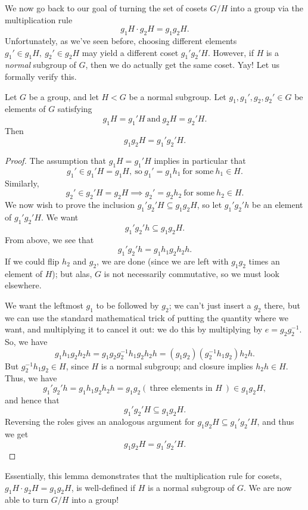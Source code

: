 \documentclass[math1530-lecture-notes]{subfiles}
\begin{document}
We now go back to our goal of turning the set of cosets $G / H$ into a group via the multiplication
rule \[
  g_1H\cdot g_2H=g_1g_2H
.\] Unfortunately, as we've seen before, choosing different elements $g_1'\in g_1H,\ g_2'\in g_2H$
may yield a different coset $g_1'g_2'H$. However, if $H$ is a \textit{normal} subgroup of $G$, then
we do actually get the same coset. Yay! Let us formally verify this.

\begin{lemma}{}
  Let $G$ be a group, and let $H<G$ be a normal subgroup. Let $g_1,g_1',g_2,g_2'\in G$ be elements
  of $G$ satisfying \[
    g_1H=g_1'H ~\text{and}~g_2H=g_2'H
  .\] Then \[
    g_1g_2H=g_1'g_2'H
  .\] 
\end{lemma}
\begin{proof}[Proof]
  The assumption that $g_1H=g_1'H$ implies in particular that \[
    g_1'\in g_1'H=g_1H, ~\text{so}~g_1'=g_1h_1 ~\text{for some}~h_1\in H
  .\] Similarly, \[
    g_2'\in g_2'H=g_2H \implies g_2'=g_2h_2~\text{for some}~h_2\in H
  .\] We now wish to prove the inclusion $g_1'g_2'H\subseteq g_1g_2H$, so let $g_1'g_2'h$ be an
  element of $g_1'g_2'H$. We want \[
     g_1'g_2'h\subseteq g_1g_2H
  .\] From above, we see that \[
     g_1'g_2'h=g_1h_1g_2h_2h
   .\] If we could flip $h_2$ and $g_2$, we are done (since we are left with $g_1g_2$ times an
   element of $H$); but alas, $G$ is not necessarily commutative, so we must look elsewhere.

   We want the leftmost $g_1$ to be followed by $g_2$; we can't just insert a $g_2$ there, but we
   can use the standard mathematical trick of putting the quantity where we want, and multiplying it
   to cancel it out: we do this by multiplying by $e=g_2g_2^{-1}$. So, we have \[
     g_1h_1g_2h_2h=g_1g_2g_2^{-1}h_1g_2h_2h=(g_1g_2)(g_2^{-1}h_1g_2)h_2h
   .\] But $g_2^{-1}h_1g_2\in H$, since $H$ is a normal subgroup; and closure implies $h_2h\in H$.
   Thus, we have \[
     g_1'g_2'h=g_1h_1g_2h_2h=g_1g_2(~\text{three elements in $H$}~)\in g_1g_2H
   ,\] and hence that \[
     g_1'g_2'H\subseteq g_1g_2H
   .\] Reversing the roles gives an analogous argument for $g_1g_2H\subseteq g_1'g_2'H$, and thus we
   get \[
     g_1g_2H=g_1'g_2'H
   .\] 
\end{proof}

Essentially, this lemma demonstrates that the multiplication rule for cosets, $g_1H\cdot
g_2H=g_1g_2H$, is well-defined if $H$ is a normal subgroup of $G$. We are now able to turn $G / H$
into a group!
\end{document}
